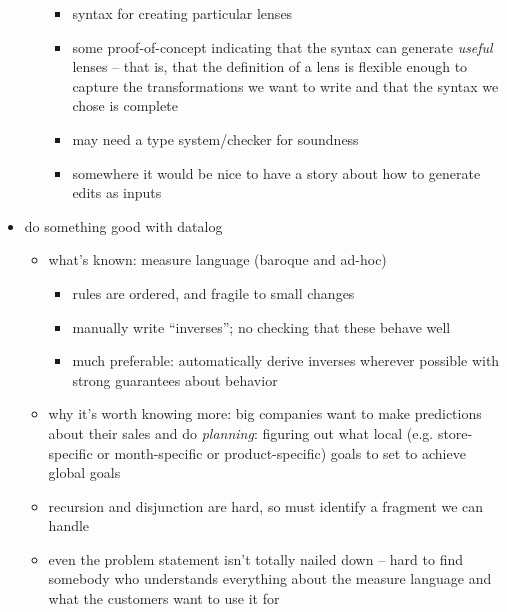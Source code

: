 \documentclass{article}
\begin{document}
\begin{itemize}
\begin{itemize}
\begin{itemize}
                    \item syntax for creating particular lenses
                    \item some proof-of-concept indicating that the syntax
                        can generate \emph{useful} lenses -- that is, that
                        the definition of a lens is flexible enough to
                        capture the transformations we want to write and
                        that the syntax we chose is complete
                    \item may need a type system/checker for soundness
                    \item somewhere it would be nice to have a story about
                        how to generate edits as inputs
                \end{itemize}
        \end{itemize}
    \item do something good with datalog
        \begin{itemize}
            \item what's known: measure language (baroque and ad-hoc)
                \begin{itemize}
                    \item rules are ordered, and fragile to small changes
                    \item manually write ``inverses''; no checking that
                        these behave well
                    \item much preferable: automatically derive inverses
                        wherever possible with strong guarantees about
                        behavior
                \end{itemize}
            \item why it's worth knowing more: big companies want to make
                predictions about their sales and do \emph{planning}:
                figuring out what local (e.g. store-specific or
                month-specific or product-specific) goals to set to achieve
                global goals
            \item recursion and disjunction are hard, so must identify a
                fragment we can handle
            \item even the problem statement isn't totally nailed down --
                hard to find somebody who understands everything about the
                measure language and what the customers want to use it for
        \end{itemize}

\end{itemize}
\end{document}
